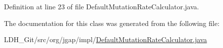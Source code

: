 Definition at line 23 of file Default\-Mutation\-Rate\-Calculator.\-java.



The documentation for this class was generated from the following file\-:\begin{DoxyCompactItemize}
\item 
L\-D\-H\-\_\-\-Git/src/org/jgap/impl/\hyperlink{_default_mutation_rate_calculator_8java}{Default\-Mutation\-Rate\-Calculator.\-java}\end{DoxyCompactItemize}
